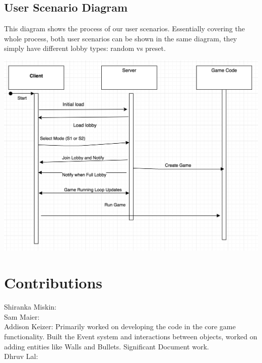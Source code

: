 \documentclass[12pt]{report}
\begin{document}
\section{User Scenario Diagram}
This diagram shows the process of our user scenarios. Essentially covering the whole process, both user scenarios can be shown in the same diagram, they simply have different lobby types: random vs preset.

\includegraphics[width=\linewidth]{images/game_process.png}

\chapter{Contributions}

Shiranka Miskin: \\
Sam Maier: \\
Addison Keizer: Primarily worked on developing the code in the core game functionality. Built the Event system and interactions between objects, worked on adding entities like Walls and Bullets. Significant Document work. \\
Dhruv Lal: \\
\end{document}
